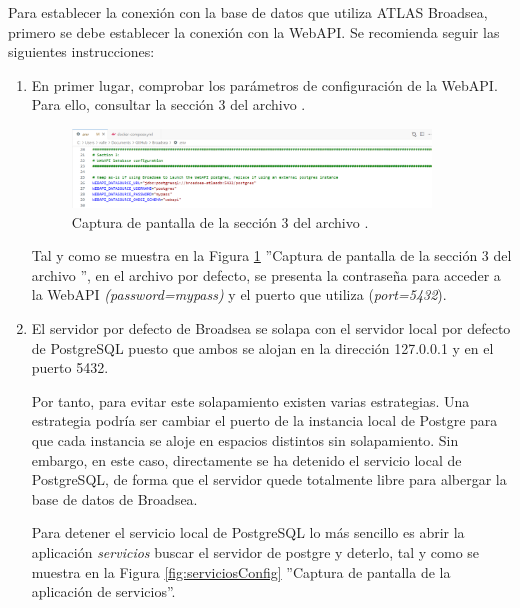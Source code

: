 Para establecer la conexión con la base de datos que utiliza ATLAS Broadsea, primero se debe establecer la conexión con la WebAPI. Se recomienda seguir las siguientes instrucciones:

\begin{enumerate}

    \item En primer lugar, comprobar los parámetros de configuración de la WebAPI. Para ello, consultar la sección 3 del archivo .
    
    \begin{figure}[H]
    \centering
    \includegraphics[width=0.90\textwidth]{figures/seccion3env.png}
     \caption{Captura de pantalla de la sección 3 del archivo .}
    \label{fig:seccion3env}
    \end{figure}


    Tal y como se muestra en la Figura \ref{fig:seccion3env} ''Captura de pantalla de la sección 3 del archivo '', en el archivo por defecto, se presenta la contraseña para acceder a la WebAPI \textit{(password=mypass)} y el puerto que utiliza (\textit{port=5432}).

    \item El servidor por defecto de Broadsea se solapa con el servidor local por defecto de PostgreSQL puesto que ambos se alojan en la dirección 127.0.0.1 y en el puerto 5432. 
    
    Por tanto, para evitar este solapamiento existen varias estrategias. Una estrategia podría ser cambiar el puerto de la instancia local de Postgre para que cada instancia se aloje en espacios distintos sin solapamiento. Sin embargo, en este caso, directamente se ha detenido el servicio local de PostgreSQL, de forma que el servidor quede totalmente libre para albergar la base de datos de Broadsea.

    Para detener el servicio local de PostgreSQL lo más sencillo es abrir la aplicación \textit{servicios} buscar el servidor de postgre y deterlo, tal y como se muestra en la Figura \ref{fig:serviciosConfig} ''Captura de pantalla de la aplicación de servicios''.


\end{enumerate}
